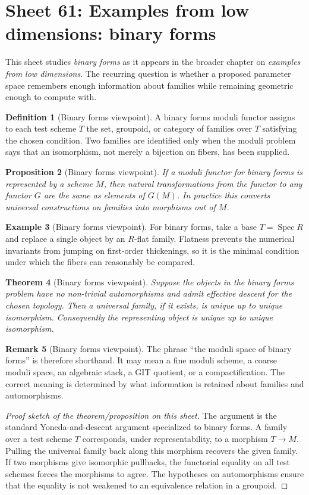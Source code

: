 \documentclass[11pt]{amsart}
\newtheorem{theorem}{Theorem}[section]
\newtheorem{proposition}[theorem]{Proposition}
\theoremstyle{definition}
\newtheorem{definition}[theorem]{Definition}
\newtheorem{example}[theorem]{Example}
\newtheorem{remark}[theorem]{Remark}
\newcommand{\Spec}{\operatorname{Spec}}
\begin{document}
\section{Sheet 61: Examples from low dimensions: binary forms}
This sheet studies \emph{binary forms} as it appears in the broader chapter on \emph{examples from low dimensions}.  The recurring question is whether a proposed parameter space remembers enough information about families while remaining geometric enough to compute with.
\begin{definition}[Binary forms viewpoint]
A binary forms moduli functor assigns to each test scheme $T$ the set, groupoid, or category of families over $T$ satisfying the chosen condition.  Two families are identified only when the moduli problem says that an isomorphism, not merely a bijection on fibers, has been supplied.
\end{definition}
\begin{proposition}[Binary forms viewpoint]
If a moduli functor for binary forms is represented by a scheme $M$, then natural transformations from the functor to any functor $G$ are the same as elements of $G(M)$.  In practice this converts universal constructions on families into morphisms out of $M$.
\end{proposition}
\begin{example}[Binary forms viewpoint]
For binary forms, take a base $T=\Spec R$ and replace a single object by an $R$-flat family.  Flatness prevents the numerical invariants from jumping on first-order thickenings, so it is the minimal condition under which the fibers can reasonably be compared.
\end{example}
\begin{theorem}[Binary forms viewpoint]
Suppose the objects in the binary forms problem have no non-trivial automorphisms and admit effective descent for the chosen topology.  Then a universal family, if it exists, is unique up to unique isomorphism.  Consequently the representing object is unique up to unique isomorphism.
\end{theorem}
\begin{remark}[Binary forms viewpoint]
The phrase ``the moduli space of binary forms'' is therefore shorthand.  It may mean a fine moduli scheme, a coarse moduli space, an algebraic stack, a GIT quotient, or a compactification.  The correct meaning is determined by what information is retained about families and automorphisms.
\end{remark}
\begin{proof}[Proof sketch of the theorem/proposition on this sheet]
The argument is the standard Yoneda-and-descent argument specialized to binary forms.  A family over a test scheme $T$ corresponds, under representability, to a morphism $T\to M$.  Pulling the universal family back along this morphism recovers the given family.  If two morphisms give isomorphic pullbacks, the functorial equality on all test schemes forces the morphisms to agree.  The hypotheses on automorphisms ensure that the equality is not weakened to an equivalence relation in a groupoid.
\end{proof}
\end{document}
